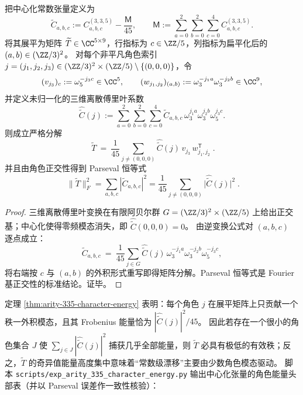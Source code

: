\begin{theorem}[角色分解 \texorpdfstring{$\Rightarrow$}{=>} 低秩机制：\texorpdfstring{$((3,3,5))$}{(3,3,5)} 的秩一外积分解与 Parseval 能量恒等式]\label{thm:arity-335-character-energy}
把中心化常数张量定义为
\[
\widetilde C_{a,b,c}:=C^{(3,3,5)}_{a,b,c}-\frac{\mathsf{M}}{45},
\qquad
\mathsf{M}:=\sum_{a=0}^2\sum_{b=0}^2\sum_{c=0}^4 C^{(3,3,5)}_{a,b,c}.
\]
将其展平为矩阵 \(\widetilde T\in\CC^{5\times 9}\)，行指标为 \(c\in\ZZ/5\)，列指标为扁平化后的 \((a,b)\in(\ZZ/3)^2\)。
对每个非平凡角色索引 \(j=(j_1,j_2,j_3)\in(\ZZ/3)^2\times(\ZZ/5)\setminus\{(0,0,0)\}\)，令
\[
(v_{j_3})_c:=\omega_5^{-j_3 c}\in\CC^{5},
\qquad
(w_{j_1,j_2})_{(a,b)}:=\omega_3^{-j_1 a}\omega_3^{-j_2 b}\in\CC^{9},
\]
并定义未归一化的三维离散傅里叶系数
\[
\widehat{\widetilde C}(j)
:=
\sum_{a=0}^2\sum_{b=0}^2\sum_{c=0}^4
\widetilde C_{a,b,c}\,\omega_3^{j_1 a}\omega_3^{j_2 b}\omega_5^{j_3 c}.
\]
则成立严格分解
\[
\boxed{\;
\widetilde T
\ =\ 
\frac{1}{45}\sum_{j\neq(0,0,0)}
\widehat{\widetilde C}(j)\,v_{j_3}\,w_{j_1,j_2}^{\mathsf T}\; }.
\]
并且由角色正交性得到 Parseval 恒等式
\[
\boxed{\;
\|\widetilde T\|_F^2
=
\sum_{a,b,c}|\widetilde C_{a,b,c}|^2
=
\frac{1}{45}\sum_{j\neq(0,0,0)}\bigl|\widehat{\widetilde C}(j)\bigr|^2\; }.
\]
\end{theorem}
\begin{proof}
三维离散傅里叶变换在有限阿贝尔群 \(G=(\ZZ/3)^2\times(\ZZ/5)\) 上给出正交基；中心化使得零频模态消失，即 \(\widehat{\widetilde C}(0,0,0)=0\)。
由逆变换公式对 \((a,b,c)\) 逐点成立：
\[
\widetilde C_{a,b,c}
\ =\ 
\frac{1}{45}\sum_{j\in G}\widehat{\widetilde C}(j)\,\omega_3^{-j_1 a}\omega_3^{-j_2 b}\omega_5^{-j_3 c},
\]
将右端按 \(c\) 与 \((a,b)\) 的外积形式重写即得矩阵分解。Parseval 恒等式是 Fourier 基正交性的标准结论。证毕。
\end{proof}

\begin{remark}\label{rem:arity-335-character-energy-diagnostic}
定理 \ref{thm:arity-335-character-energy} 表明：每个角色 \(j\) 在展平矩阵上只贡献一个秩一外积模态，且其 Frobenius 能量恰为 \(|\widehat{\widetilde C}(j)|^2/45\)。
因此若存在一个很小的角色集合 \(J\) 使 \(\sum_{j\in J}|\widehat{\widetilde C}(j)|^2\) 捕获几乎全部能量，则 \(\widetilde T\) 必具有极低的有效秩；反之，\(\widetilde T\) 的奇异值能量高度集中意味着“常数级漂移”主要由少数角色模态驱动。
脚本 \texttt{scripts/exp\_arity\_335\_character\_energy.py} 输出中心化张量的角色能量头部表（并以 Parseval 误差作一致性核验）：

\end{remark}

